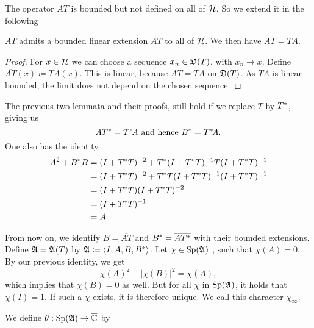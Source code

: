 The operator $AT$ is bounded but not defined on all of $\mathcal{H}$. So we extend it
in the following

\begin{lem}
 $AT$ admits a bounded linear extension $\overline{AT}$ to all of $\mathcal{H}$. 
 We then have $\overline{AT}=TA$.
\end{lem}

\begin{proof}
 For $x \in \mathcal{H}$ we can choose a sequence $x_n \in \mathfrak{D}(T)$, with 
 $x_n \rightarrow x$. Define $\overline{AT}(x) \coloneqq TA(x)$.
 This is linear, because $AT = TA$ on $\mathfrak{D}(T)$. As $TA$ is linear bounded,
 the limit does not depend on the chosen sequence.
\end{proof}

\begin{rem}
 The previous two lemmata and their proofs, still hold if we replace $T$ by $T^{*}$,
 giving us 
 \[
  AT^{*} = T^{*} \! A \text{ and hence } B^{*} = T^{*} \! A.
 \]
 One also has the identity
 \begin{align*}
  A^2 + B^{*} B &= (I + T^{*} T)^{-2} + T ^{*} (I + T^{*} T)
		    ^{-1} T (I + T^{*} T) ^{-1} \\
		&= (I + T^{*} T)^{-2} + T ^{*} T(I + T^{*} T)
		   ^{-1} (I + T^{*} T) ^{-1} \\
		&= (I + T^{*} T)(I + T^{*} T)^{-2} \\
		&= (I + T^{*} T)^{-1}  \\
		&= A .
  \end{align*}

  

\end{rem}

From now on, we identify $B=\overline{AT}$ and $B^{*} =\overline{AT^{*}}$
with their bounded extensions.
Define $\mathfrak{A} = \mathfrak{A}(T)$ by $\mathfrak{A} \coloneqq  \left\langle I, A, B , B^{*} \right\rangle$. Let $ \chi \in \operatorname{Sp} (\mathfrak{A})$
, such that $\chi(A) =0$. By our previous identity, we get
\[
 \chi(A)^2 + |\chi(B)|^2 = \chi(A),
\]
which implies that $\chi(B) =0$ as well. But for all $\chi$ in  $\operatorname{Sp} (\mathfrak{A})$, 
 it holds that $\chi(I)=1$.
If such a $\chi$ exists, it is therefore unique. We call this
character $\chi_\infty$.

We define $\theta : \operatorname{Sp} (\mathfrak{A}) \to {\overline{\mathbb{C}}}$ by

